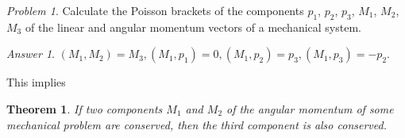 \documentclass[leqno]{report}
\numberwithin{equation}{section}
\theoremstyle{plain}
\newtheorem*{thm*}{Theorem}
\theoremstyle{definition}
\theoremstyle{remark}
\theoremstyle{smallcap}
\newtheorem*{prob*}{Problem}
\numberwithin{prob}{section}
\newtheorem*{ans*}{Answer}
\begin{document}
\begin{prob*}
  Calculate the Poisson brackets of the components
  $p_1$, $p_2$, $p_3$, $M_1$, $M_2$, $M_3$ of the
  linear and angular momentum vectors of
  a mechanical system.

  \begin{ans*}
    $(M_1, M_2) = M_3, (M_1, p_1) = 0, (M_1, p_2) = p_3, (M_1, p_3) = -p_2.$
  \end{ans*}

\end{prob*}

This implies

{\small
\begin{thm*}
  If two components $M_1$ and $M_2$ of the angular momentum
  of some mechanical problem are conserved,
  then the third component is also conserved.
\end{thm*}
}
\end{document}
